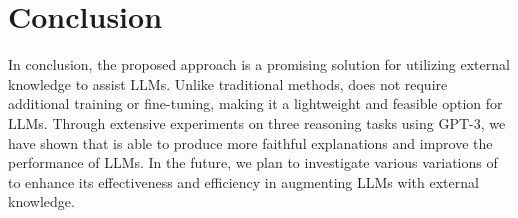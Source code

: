 \section{Conclusion}

In conclusion, the proposed approach is a promising solution for utilizing external knowledge to assist LLMs. Unlike traditional methods, \NAME{} does not require additional training or fine-tuning, making it a lightweight and feasible option for LLMs. Through extensive experiments on three reasoning tasks using GPT-3, we have shown that \NAME{} is able to produce more faithful explanations and improve the performance of LLMs.  In the future, we plan to investigate various variations of \NAME{} to enhance its effectiveness and efficiency in augmenting LLMs with external knowledge. 








